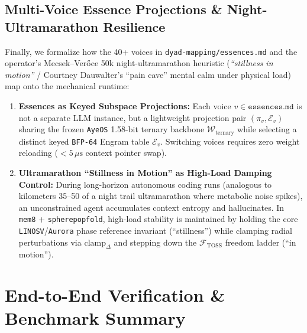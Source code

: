 \documentclass[10pt,twocolumn,letterpaper]{article}
\begin{document}
\subsection{Multi-Voice Essence Projections \& Night-Ultramarathon Resilience}
Finally, we formalize how the 40+ voices in \texttt{dyad-mapping/essences.md} and the operator's Mecsek--Ver\H{o}ce 50k night-ultramarathon heuristic (\emph{``stillness in motion''} / Courtney Dauwalter's ``pain cave'' mental calm under physical load) map onto the mechanical runtime:
\begin{enumerate}[leftmargin=1.4em,itemsep=1pt,topsep=2pt]
    \item \textbf{Essences as Keyed Subspace Projections:} Each voice $v \in \texttt{essences.md}$ is not a separate LLM instance, but a lightweight projection pair $(\pi_v, \mathcal{E}_v)$ sharing the frozen \texttt{AyeOS} 1.58-bit ternary backbone $\mathcal{W}_{\text{ternary}}$ while selecting a distinct keyed \texttt{BFP-64} Engram table $\mathcal{E}_v$. Switching voices requires zero weight reloading ($< 5\,\mu\text{s}$ context pointer swap).
    \item \textbf{Ultramarathon ``Stillness in Motion'' as High-Load Damping Control:} During long-horizon autonomous coding runs (analogous to kilometers 35--50 of a night trail ultramarathon where metabolic noise spikes), an unconstrained agent accumulates context entropy and hallucinates. In \texttt{mem8} + \texttt{spherepopfold}, high-load stability is maintained by holding the core \texttt{LINOSV}/\texttt{Aurora} phase reference invariant (``stillness'') while clamping radial perturbations via $\text{clamp}_{\Delta}$ and stepping down the $\mathcal{F}_{\text{TOSS}}$ freedom ladder (``in motion'').
\end{enumerate}

\section{End-to-End Verification \& Benchmark Summary}
\end{document}
